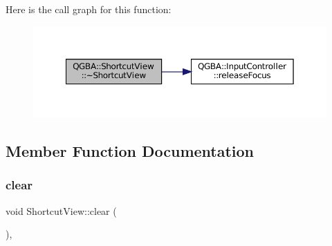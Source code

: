 Here is the call graph for this function\+:
\nopagebreak
\begin{figure}[H]
\begin{center}
\leavevmode
\includegraphics[width=350pt]{class_q_g_b_a_1_1_shortcut_view_ab8db5a97fc30078a806845506defc2b9_cgraph}
\end{center}
\end{figure}


\subsection{Member Function Documentation}
\mbox{\label{class_q_g_b_a_1_1_shortcut_view_af2ed13e937f86700eb78e616e04b706f}} 
\subsubsection{\texorpdfstring{clear}{clear}}
{\footnotesize\ttfamily void Shortcut\+View\+::clear (\begin{DoxyParamCaption}{ }\end{DoxyParamCaption})\hspace{0.3cm}{\ttfamily [private]}, {\ttfamily [slot]}}

